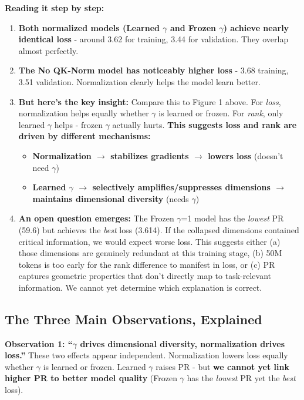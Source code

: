 \documentclass[11pt]{article}
\begin{document}
\textbf{Reading it step by step:}

\begin{enumerate}
\item \textbf{Both normalized models (Learned $\gamma$ and Frozen $\gamma$) achieve nearly identical loss} - around 3.62 for training, 3.44 for validation. They overlap almost perfectly.

\item \textbf{The No QK-Norm model has noticeably higher loss} - 3.68 training, 3.51 validation. Normalization clearly helps the model learn better.

\item \textbf{But here's the key insight:} Compare this to Figure 1 above. For \textit{loss}, normalization helps equally whether $\gamma$ is learned or frozen. For \textit{rank}, only learned $\gamma$ helps - frozen $\gamma$ actually hurts. \textbf{This suggests loss and rank are driven by different mechanisms:}
\begin{itemize}
\item \textbf{Normalization $\rightarrow$ stabilizes gradients $\rightarrow$ lowers loss} (doesn't need $\gamma$)
\item \textbf{Learned $\gamma$ $\rightarrow$ selectively amplifies/suppresses dimensions $\rightarrow$ maintains dimensional diversity} (needs $\gamma$)
\end{itemize}

\item \textbf{An open question emerges:} The Frozen $\gamma$=1 model has the \textit{lowest} PR (59.6) but achieves the \textit{best} loss (3.614). If the collapsed dimensions contained critical information, we would expect worse loss. This suggests either (a) those dimensions are genuinely redundant at this training stage, (b) 50M tokens is too early for the rank difference to manifest in loss, or (c) PR captures geometric properties that don't directly map to task-relevant information. We cannot yet determine which explanation is correct.
\end{enumerate}

\subsection{The Three Main Observations, Explained}

\begin{tcolorbox}[colback=gray!10, colframe=gray!50, arc=2mm, boxrule=0.5pt]
\textbf{Observation 1: ``$\gamma$ drives dimensional diversity, normalization drives loss.''} These two effects appear independent. Normalization lowers loss equally whether $\gamma$ is learned or frozen. Learned $\gamma$ raises PR - but \textbf{we cannot yet link higher PR to better model quality} (Frozen $\gamma$ has the \textit{lowest} PR yet the \textit{best} loss).
\end{tcolorbox}
\end{document}
